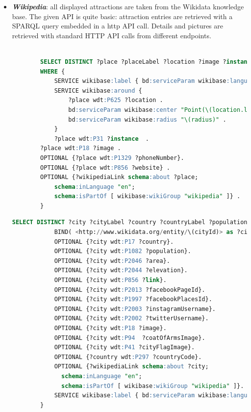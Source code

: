 \documentclass[a4paper, 11pt, parskip=half]{scrreprt}
\theoremstyle{definition}
\begin{document}
\begin{itemize}
	\item \textit{\textbf{Wikipedia}}: all displayed attractions are taken from the Wikidata knowledge base. The given API is quite basic: attraction entries are retrieved with a SPARQL query embedded in a http API call. Details and pictures are retrieved with standard HTTP API calls from different endpoints.
		
		\begin{lstlisting}[language=sql, caption={SPARQL query for attraction retrieving}, captionpos=b]
		
		SELECT DISTINCT ?place ?placeLabel ?location ?image ?instance ?phoneNumber ?website ?wikipediaLink
        WHERE {
            SERVICE wikibase:label { bd:serviceParam wikibase:language "en, it" }
            SERVICE wikibase:around {
                ?place wdt:P625 ?location .
                bd:serviceParam wikibase:center "Point(\(location.longitude) \(location.latitude))"^^geo:wktLiteral .
                bd:serviceParam wikibase:radius "\(radius)" .
            }
            ?place wdt:P31 ?instance  .
        ?place wdt:P18 ?image .
        OPTIONAL {?place wdt:P1329 ?phoneNumber}.
        OPTIONAL {?place wdt:P856 ?website} .
        OPTIONAL {?wikipediaLink schema:about ?place;
            schema:inLanguage "en";
            schema:isPartOf [ wikibase:wikiGroup "wikipedia" ]} .
        }
		\end{lstlisting}
		
		\begin{lstlisting}[language=sql, caption={SPARQL query for city detail retrieving}, captionpos=b]
			SELECT DISTINCT ?city ?cityLabel ?country ?countryLabel ?population ?area ?elevation ?link ?facebookPageId ?facebookPlacesId ?instagramUsername ?twitterUsername ?image ?coatOfArmsImage ?cityFlagImage ?countryCode ?wikipediaLink WHERE {
            BIND( <http://www.wikidata.org/entity/\(cityId)> as ?city ).
            OPTIONAL {?city wdt:P17 ?country}.
            OPTIONAL {?city wdt:P1082 ?population}.
            OPTIONAL {?city wdt:P2046 ?area}.
            OPTIONAL {?city wdt:P2044 ?elevation}.
            OPTIONAL {?city wdt:P856 ?link}.
            OPTIONAL {?city wdt:P2013 ?facebookPageId}.
            OPTIONAL {?city wdt:P1997 ?facebookPlacesId}.
            OPTIONAL {?city wdt:P2003 ?instagramUsername}.
            OPTIONAL {?city wdt:P2002 ?twitterUsername}.
            OPTIONAL {?city wdt:P18 ?image}.
            OPTIONAL {?city wdt:P94  ?coatOfArmsImage}.
            OPTIONAL {?city wdt:P41 ?cityFlagImage}.
            OPTIONAL {?country wdt:P297 ?countryCode}.
            OPTIONAL {?wikipediaLink schema:about ?city;
              schema:inLanguage "en";
              schema:isPartOf [ wikibase:wikiGroup "wikipedia" ]}.
            SERVICE wikibase:label { bd:serviceParam wikibase:language "en". }
        }
		\end{lstlisting}
		

\end{itemize}
\end{document}
